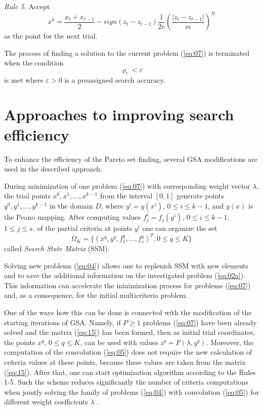 \documentclass[runningheads]{llncs}
\begin{document}
\textit{Rule 5.} Accept
\begin{equation}
    \label{eq:13}
    x^{k} = \frac{x_t + x_{t-1}}{2} - sign(z_t - z_{t-1}) \frac{1}{2r} \left(\frac{|z_t - z_{t-1}|}{m} \right)^N
\end{equation}
as the point for the next trial.

The process of finding a solution to the current problem (\ref{eq:07}) is terminated when the condition
\begin{equation}
    \label{eq:14}
    \varrho_t < \varepsilon
\end{equation}
is met where $\varepsilon > 0$ is a preassigned search accuracy.



\section{Approaches to improving search efficiency}
\label{sec:4}

To enhance the efficiency of the Pareto set finding, several GSA modifications are used in the described approach.

During minimization of one problem (\ref{eq:07}) with corresponding weight vector $\lambda$, the trial points $x^0, x^1,\dots,x^{k-1}$ from the interval $[0,1]$ generate points $y^0, y^1,\dots,y^{k-1}$ in the domain $D$, where $y^i=y(x^i)$, $0 \leq i \leq k-1$, and $y(x)$ is the Peano mapping. After computing values $f^i_j=f_j(y^i)$, $0 \leq i \leq k-1$, $1 \leq j \leq s$, of the partial criteria at points $y^i$ one can organize the set 
\begin{equation}
    \label{eq:15}
    \Omega_K=\{(x^q,y^q,f^q_1,\dots,f^q_s)^T: 0 \leq q \leq K\}
\end{equation}
called \textit{Search State Matrix} (SSM).

Solving new problems (\ref{eq:04}) allows one to replenish SSM with new elements and to save the additional information on the investigated problem (\ref{eq:02a}). This information can accelerate the minimization process for problems (\ref{eq:07}) and, as a consequence, for the initial multicriteria problem. 

One of the ways how this can be done is connected with the modification of the starting iterations of GSA. Namely, if $P \geq 1$ problems (\ref{eq:07}) have been already solved and the matrix (\ref{eq:15}) has been formed, then as initial trial coordinates, the points $x^q$, $0 \leq q \leq K$, can be used with values $z^q = F(\lambda,y^q)$. Moreover, the computation of the convolution (\ref{eq:05}) does not require the new calculation of criteria values at these points, because these values are taken from the matrix (\ref{eq:15}). After that, one can start optimization algorithm according to the Rules 1-5. Such the scheme reduces significantly the number of criteria computations when jointly solving the family of problems (\ref{eq:04}) with convolution (\ref{eq:05}) for different weight coefficients $\lambda$ \cite{ML_MCO_2023,Gergel2018,GergelKozinov2020}.
\end{document}
